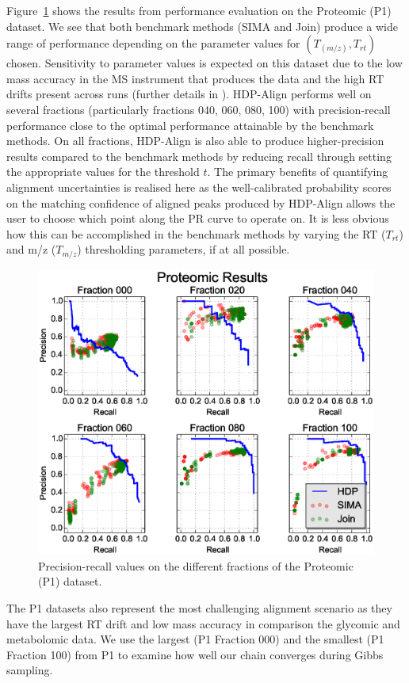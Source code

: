 Figure~\ref{fig:proteomic_results} shows the results from performance evaluation on the Proteomic (P1) dataset. We see that both benchmark methods (SIMA and Join) produce a wide range of performance depending on the parameter values for $(T_{(m/z)}, T_{rt})$ chosen. Sensitivity to parameter values is expected on this dataset due to the low mass accuracy in the MS instrument that produces the data and the high \ac{RT} drifts present across runs (further details in \cite{Lange2008}). HDP-Align performs well on several fractions (particularly fractions 040, 060, 080, 100) with precision-recall performance close to the optimal performance attainable by the benchmark methods. On all fractions, HDP-Align is also able to produce higher-precision results compared to the benchmark methods by reducing recall through setting the appropriate values for the threshold $t$. The primary benefits of quantifying alignment uncertainties is realised here as the well-calibrated probability scores on the matching confidence of aligned peaks produced by HDP-Align allows the user to choose which point along the PR curve to operate on. It is less obvious how this can be accomplished in the benchmark methods by varying the \ac{RT} ($T_{rt}$) and m/z ($T_{m/z}$) thresholding parameters, if at all possible.

\begin{figure}[!htbp]
\centering\includegraphics[width=0.7\linewidth]{06-hdp/figures/figure_4.eps}
\centering\caption{\label{fig:proteomic_results}Precision-recall values on the different fractions of the Proteomic (P1) dataset.}
\end{figure}

The P1 datasets also represent the most challenging alignment scenario as they have the largest RT drift and low mass accuracy in comparison the glycomic and metabolomic data. We use the largest (P1 Fraction 000) and the smallest (P1 Fraction 100) from P1 to examine how well our chain converges during Gibbs sampling. 

